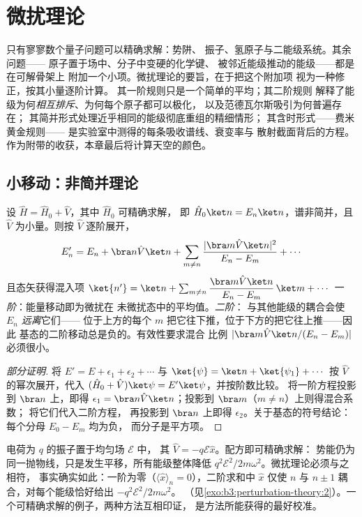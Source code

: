 \chapter{微扰理论}\label{ch:b3:perturbation-theory}

只有寥寥数个量子问题可以精确求解：势阱、
振子、氢原子与二能级系统。其余问题——
原子置于场中、分子中变硬的化学键、
被邻近能级推动的能级——都是在可解骨架上
附加一个小项。微扰理论的要旨，在于把这个附加项
视为一种修正，按其小量逐阶计算。
其一阶规则只是一个简单的平均；其二阶规则
解释了能级为何\emph{相互排斥}、为何每个原子都可以极化，
以及范德瓦尔斯吸引为何普遍存在；
其简并形式处理近乎相同的能级彻底重组的精细情形；
其含时形式——费米黄金规则——
是实验室中测得的每条吸收谱线、衰变率与
散射截面背后的方程。
作为附带的收获，本章最后将计算天空的颜色。

\section{小移动：非简并理论}

\begin{theorem}[微扰修正]\label{thm:b3:perturbation-theory:corrections}
设 $\hat H = \hat H_0 + \hat V$，其中 $\hat H_0$ 可精确求解，
即 $\hat H_0\ket n = E_n\ket n$，谱非简并，且 $\hat V$
为小量。则按 $\hat V$ 逐阶展开，
\[
E_n' = E_n + \bra n\hat V\ket n
 + \sum_{m \neq n}\frac{|\bra m\hat V\ket n|^2}{E_n - E_m}
 + \cdots
\]
且态矢获得混入项 $\ket{n'} = \ket n + \sum_{m\neq
n}\dfrac{\bra m\hat V\ket n}{E_n - E_m}\,\ket m + \cdots$
\emph{一阶}：能量移动即为微扰在
未微扰态中的平均值。\emph{二阶}：
与其他能级的耦合会使 $E_n$ \emph{远离}它们——
位于上方的每个 $m$ 把它往下推，位于下方的把它往上推——因此
基态的二阶移动总是负的。有效性要求混合
比例 $|\bra m\hat V\ket n/(E_n - E_m)|$ 必须很小。
\end{theorem}

\begin{proof}[部分证明]
将 $E' = E + \epsilon_1 + \epsilon_2 + \cdots$ 与 $\ket{\psi} =
\ket n + \ket{\psi_1} + \cdots$ 按 $\hat V$ 的幂次展开，代入
$(\hat H_0 + \hat V)\ket\psi = E'\ket\psi$，并按阶数比较。
将一阶方程投影到 $\bra n$ 上，即得 $\epsilon_1 =
\bra n\hat V\ket n$；投影到 $\bra m$（$m \neq n$）上则得混合系数；
将它们代入二阶方程，
再投影到 $\bra n$ 上即得 $\epsilon_2$。关于基态的符号结论：
每个分母 $E_0 - E_m$ 均为负，
而分子是平方项。
\end{proof}

\begin{proposition}[可精确求解的微扰]\label{prop:b3:perturbation-theory:oscillator-field}
电荷为 $q$ 的振子置于均匀场 $\mathcal E$ 中，
其 $\hat V = -q\mathcal E\hat x$。配方即可精确求解：
势能仍为同一抛物线，只是发生平移，所有能级整体降低
$q^2\mathcal E^2/2m\omega^2$。微扰理论必须与之相符，
事实确实如此：一阶为零（$\langle\hat
x\rangle_n = 0$），二阶求和中 $\hat x$
仅使 $n$ 与 $n \pm 1$ 耦合，对每个能级恰好给出
$-q^2\mathcal E^2/2m\omega^2$。
（见\cref{exo:b3:perturbation-theory:2}）。一个可精确求解的例子，两种方法互相印证，
是方法所能获得的最好校准。
\end{proposition}

